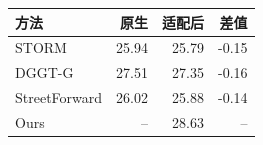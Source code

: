 \begin{minipage}[t]{0.48\textwidth}
\captionsetup{type=table}
\centering\small
\caption{转为固定规范资产对重建的影响，PSNR 单位为 dB。}
\label{tab:adapter-effect}
\begin{tabular}{@{}lrrr@{}}
\toprule
方法 & 原生 & 适配后 & 差值 \\
\midrule
STORM & 25.94 & 25.79 & -0.15 \\
DGGT-G & 27.51 & 27.35 & -0.16 \\
StreetForward & 26.02 & 25.88 & -0.14 \\
Ours & -- & 28.63 & -- \\
\bottomrule
\end{tabular}
\end{minipage}
\par\medskip

